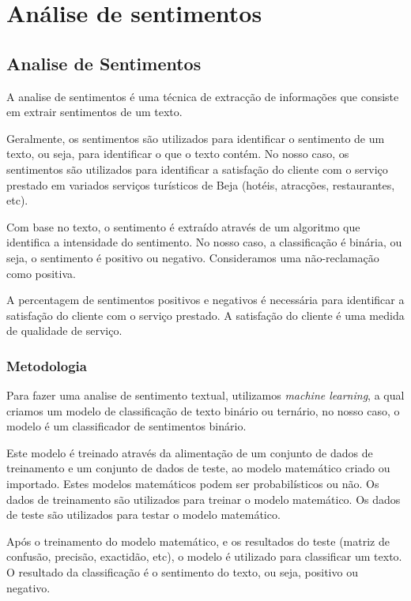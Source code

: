 \chapter{Análise de sentimentos}
\label{cap6}

\section{Analise de Sentimentos}

A analise de sentimentos é uma técnica de extracção de informações que consiste em extrair sentimentos de um texto.

Geralmente, os sentimentos são utilizados para identificar o sentimento de um texto, ou seja, para identificar o que o texto contém. No nosso caso, os sentimentos são utilizados para identificar a satisfação do cliente com o serviço prestado em variados serviços turísticos de Beja (hotéis, atracções, restaurantes, etc).

Com base no texto, o sentimento é extraído através de um algoritmo que identifica a intensidade do sentimento. No nosso caso, a classificação é binária, ou seja, o sentimento é positivo ou negativo. Consideramos uma não-reclamação como positiva.

A percentagem de sentimentos positivos e negativos é necessária para identificar a satisfação do cliente com o serviço prestado. A satisfação do cliente é uma medida de qualidade de serviço.

\subsection{Metodologia}

Para fazer uma analise de sentimento textual, utilizamos \textit{machine learning}, a qual criamos um modelo de classificação de texto binário ou ternário, no nosso caso, o modelo é um classificador de sentimentos binário.

Este modelo é treinado através da alimentação de um conjunto de dados de treinamento e um conjunto de dados de teste, ao modelo matemático criado ou importado. Estes modelos matemáticos podem ser probabilísticos ou não. Os dados de treinamento são utilizados para treinar o modelo matemático. Os dados de teste são utilizados para testar o modelo matemático.

Após o treinamento do modelo matemático, e os resultados do teste (matriz de confusão, precisão, exactidão, etc), o modelo é utilizado para classificar um texto. O resultado da classificação é o sentimento do texto, ou seja, positivo ou negativo.


